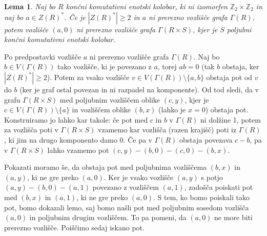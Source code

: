\documentclass[a4paper, 12pt]{amsart}
\theoremstyle{definition} %
\theoremstyle{plain} %
\newtheorem{lema}[definicija]{Lema}
\newcommand{\Z}{\mathbb Z}
\begin{document}
\begin{lema}
\label{notCutVertexProduct}
Naj bo $R$ končni komutativni enotski kolobar, ki ni izomorfen $\Z_2 \times \Z_2$ in naj bo $a\in Z(R)^*$. Če je $|Z(R)^*| \ge 2$ in $a$ ni prerezno vozlišče grafa $\Gamma(R)$, potem vozlišče $(a,0)$ ni prerezno vozlišče grafa $\Gamma(R\times S)$, kjer je $S$ poljubni končni komutativni enotski kolobar.
\end{lema}

\proof
Po predpostavki vozlišče $a$ ni prerezno vozlišče grafa $\Gamma(R)$. Naj bo $b \in V(\Gamma(R))$ tako vozlišče, ki je povezano z $a$, torej $ab = 0$ (tak $b$ obstaja, ker $|Z(R)^*|\ge 2$). Potem za vsako vozlišče $v\in V(\Gamma(R)) \setminus \{a,b\}$ obstaja pot od $v$ do $b$ (ker je  graf ostal povezan in ni razpadel na komponente). Od tod sledi, da v grafu $\Gamma(R\times S)$ med poljubnim vozliščem oblike $(c,y)$, kjer je $c\in V( \Gamma(R))\setminus \{a\}$ in vozliščem oblike $(b,x)$ (lahko je $x=0$) obstaja pot. Konstruiramo jo lahko kar takole: če pot med $c$ in $b$ v $\Gamma(R)$ ni dolžine 1, potem za vozlišča poti v $\Gamma(R\times S)$ vzamemo kar vozlišča (razen krajišč) poti iz $\Gamma(R)$, ki jim na drugo komponento damo 0. Če pa v $\Gamma(R)$ obstaja povezava $c-b$, pa v $\Gamma(R\times S)$ lahko vzamemo pot $(c,y)-(b,0)-(c,0)-(b,x)$.

Pokazati moramo še, da obstaja pot med poljubnima vozliščema $(b,x)$ in $(a,y)$, ki ne gre preko $(a,0)$. Ker je vsako vozlišče $(a,y)$ s potjo $(a,y)-(b,0)-(a,1)$ povezano z vozliščem $(a,1)$, zadošča poiskati pot med $(b,x)$ in $(a,1)$, ki ne gre preko $(a,0)$. S tem, ko bomo poiskali tako pot, bomo dokazali lemo, saj bomo našli pot med poljubnim sosedom vozlišča $(a,0)$ in poljubnim drugim vozliščem. To pa pomeni, da $(a,0)$ ne more biti prerezno vozlišče. Poiščimo sedaj iskano pot.  
\end{document}
